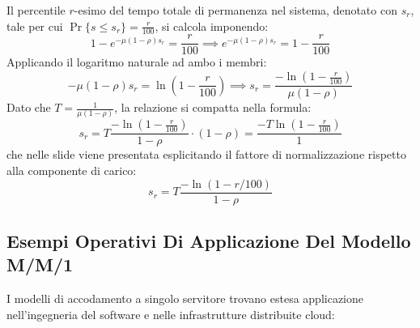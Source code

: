 \documentclass[11pt, a4paper]{article}
\begin{document}

Il percentile $r$-esimo del tempo totale di permanenza nel sistema, denotato con $s_r$, tale per cui $\Pr\{s \le s_r\} = \frac{r}{100}$, si calcola imponendo:
\[
1 - e^{-\mu(1 - \rho)s_r} = \frac{r}{100} \implies e^{-\mu(1 - \rho)s_r} = 1 - \frac{r}{100}
\]
Applicando il logaritmo naturale ad ambo i membri:
\[
-\mu(1 - \rho)s_r = \ln\left(1 - \frac{r}{100}\right) \implies s_r = \frac{-\ln\left(1 - \frac{r}{100}\right)}{\mu(1 - \rho)}
\]
Dato che $T = \frac{1}{\mu(1 - \rho)}$, la relazione si compatta nella formula:
\[
\boxed{s_r = T \frac{-\ln\left(1 - \frac{r}{100}\right)}{1 - \rho} \cdot (1 - \rho) = \frac{-T \ln\left(1 - \frac{r}{100}\right)}{1}}
\]
che nelle slide viene presentata esplicitando il fattore di normalizzazione rispetto alla componente di carico:
\[
\boxed{s_r = T \frac{-\ln(1 - r/100)}{1 - \rho}}
\]

\subsection{Esempi Operativi Di Applicazione Del Modello M/M/1}

I modelli di accodamento a singolo servitore trovano estesa applicazione nell'ingegneria del software e nelle infrastrutture distribuite cloud:
\end{document}
